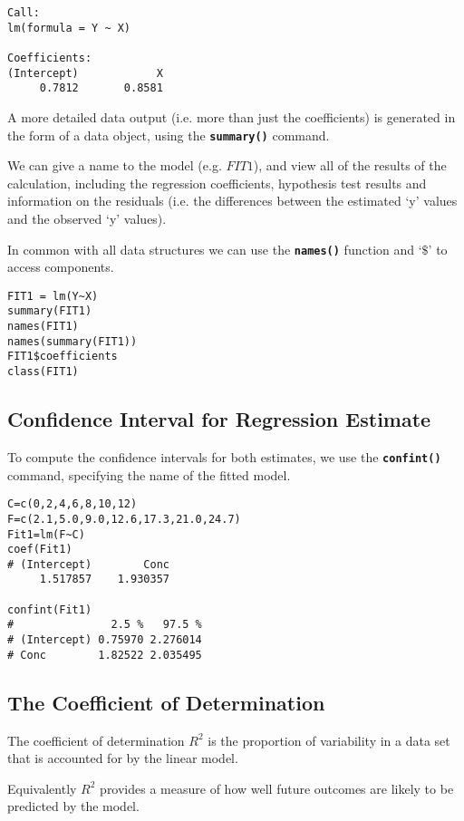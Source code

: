 \begin{verbatim}
Call:
lm(formula = Y ~ X)

Coefficients:
(Intercept)            X
     0.7812       0.8581
\end{verbatim}

A more detailed data output (i.e. more than just the coefficients) is generated in the form of a data object, using the \textbf{\texttt{summary()}} command.

We can give a name to the model (e.g. $FIT1$), and view all of the results of the calculation, including the regression coefficients, hypothesis test results and information on the residuals (i.e. the differences between the estimated ‘y’ values and the observed ‘y’ values).

In common with all data structures we can use the \textbf{\texttt{names()}} function and ‘$\$$’ to access components.

\begin{framed}
\begin{verbatim}
FIT1 = lm(Y~X)
summary(FIT1)
names(FIT1)
names(summary(FIT1))
FIT1$coefficients
class(FIT1)
\end{verbatim}
\end{framed}
\newpage
\subsection{Confidence Interval for Regression Estimate}
To compute the confidence intervals for both estimates, we use the \texttt\textbf{{confint()}} command, specifying the name of the fitted model.
\begin{framed}
\begin{verbatim}
C=c(0,2,4,6,8,10,12)
F=c(2.1,5.0,9.0,12.6,17.3,21.0,24.7)
Fit1=lm(F~C)
coef(Fit1)
# (Intercept)        Conc
     1.517857    1.930357

confint(Fit1)
#               2.5 %   97.5 %
# (Intercept) 0.75970 2.276014
# Conc        1.82522 2.035495
\end{verbatim}
\end{framed}

\subsection{The Coefficient of Determination}
The coefficient of determination $R^2$ is the proportion of variability in a data set that is accounted for by the linear model.

Equivalently $R^2$ provides a measure of how well future outcomes are likely to be predicted by the model.

